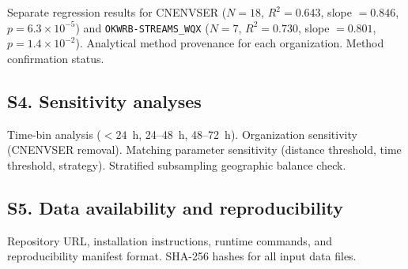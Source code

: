 \documentclass[lineno]{wlpeerj}
\begin{document}
Separate regression results for CNENVSER ($N=18$, $R^{2} = 0.643$, slope $= 0.846$, $p = 6.3 \times 10^{-5}$) and \texttt{OKWRB-STREAMS\_WQX} ($N=7$, $R^{2} = 0.730$, slope $= 0.801$, $p = 1.4 \times 10^{-2}$). Analytical method provenance for each organization. Method confirmation status.

\subsection*{S4. Sensitivity analyses}

Time-bin analysis ($< 24$~h, 24--48~h, 48--72~h). Organization sensitivity (CNENVSER removal). Matching parameter sensitivity (distance threshold, time threshold, strategy). Stratified subsampling geographic balance check.

\subsection*{S5. Data availability and reproducibility}

Repository URL, installation instructions, runtime commands, and reproducibility manifest format. SHA-256 hashes for all input data files.
\end{document}
